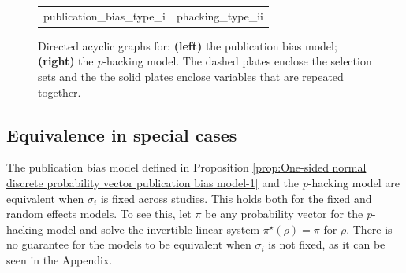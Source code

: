 \documentclass[preprint, authoryear]{elsarticle}
\theoremstyle{plain}
\theoremstyle{definition}
\begin{document}
\begin{figure}
\begin{center}     
 \begin{tabular}{cc}    
  {publication_bias_type_i} &     
  {phacking_type_ii}
 \end{tabular} 
\end{center}
\caption{\label{fig:Plate notation, publication bias and p-hacking} Directed acyclic graphs for: {\bf (left)}
the publication bias model; {\bf (right)} the \emph{p}-hacking model. The dashed plates enclose the selection sets and the the solid plates enclose variables that are repeated together.}
\end{figure}


\subsection{Equivalence in special cases}
The publication bias model defined in Proposition \ref{prop:One-sided normal discrete probability vector publication bias model-1} and the \emph{p}-hacking model are equivalent when $\sigma_{i}$ is fixed across studies. This holds both for the fixed and random effects models. To see this, let $\pi$ be any probability vector for the \emph{p}-hacking model and solve the invertible linear system $\pi^{\star}\left(\rho\right)=\pi$ for $\rho$. There is no guarantee for the models to be equivalent when $\sigma_{i}$ is not fixed, as it can be seen in the Appendix.
\end{document}
